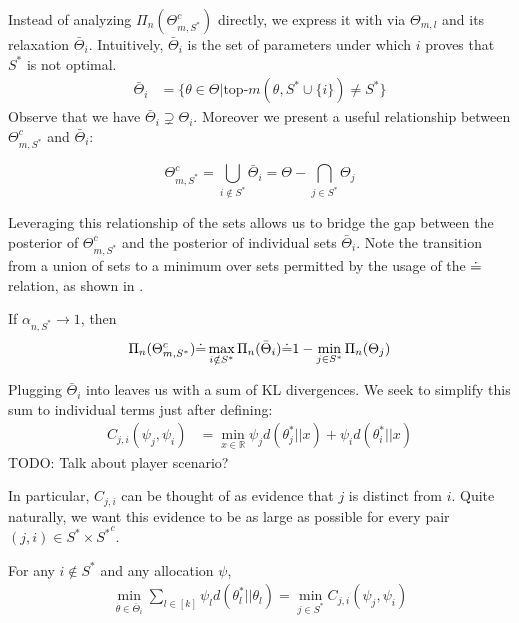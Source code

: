 Instead of analyzing $\Pi_n(\Theta_{m, S^*}^c)$ directly, we express it with via $\Theta_{m, l}$ and its relaxation $\bar{\Theta}_i$. Intuitively, $\bar{\Theta}_i$ is the set of parameters under which $i$ proves that $S^*$ is not optimal.
\begin{align}
    \bar{\Theta}_i &= \{ \theta \in \Theta | \text{top-}m(\theta, S^* \cup \{i\}) \neq S^*\}
\end{align}
Observe that we have $\bar{\Theta}_i \supsetneq \Theta_i$. Moreover we present a useful relationship between $\Theta_{m, S^*}^c$ and $\bar{\Theta}_i$:
\begin{lemma}\label{lemma:set_relation_S*_i}
  \[\Theta_{m, S^*}^c = \bigcup_{i \notin S^*} \bar{\Theta}_i = \Theta - \bigcap_{j \in S^*} \Theta_j\]
\end{lemma}
Leveraging this relationship of the sets allows us to bridge the gap between the posterior of $\Theta_{m, S^*}^c$ and the posterior of individual sets $\bar{\Theta}_i$. Note the transition from a union of sets to a minimum over sets permitted by the usage of the $\dot{=}$ relation, as shown in .
\begin{lemma}\label{lemma:posterior_S*_i} If $\alpha_{n, S^*} \rightarrow 1$, then
  \begin{align}
    \Pi_n(\Theta_{m, S^*}^c) \dot{=} \max_{i \notin S^*} \Pi_n(\bar{\Theta}_i) \dot{=} 1 - \min_{j \in S^*} \Pi_n(\Theta_j)
  \end{align}
\end{lemma}

Plugging $\bar{\Theta}_i$ into  leaves us with a sum of KL divergences. We seek to simplify this sum to individual terms just after defining:
\begin{align}
  C_{j, i}(\psi_j,\psi_i) &=  \min_{x \in \mathbb{R}} \psi_j d(\theta^*_{j} || x) + \psi_i d(\theta_{i}^* ||x) \label{eq:C}
\end{align}
TODO: Talk about player scenario?

In particular, $C_{j, i}$ can be thought of as evidence that $j$ is distinct from $i$. Quite naturally, we want this evidence to be as large as possible for every pair $(j, i) \in S^* \times {S^*}^c$.

\begin{lemma}\label{lemma:kl_to_C}
  For any $i \notin S^*$ and any allocation $\psi$,
  \begin{align}
    \min_{\theta \in \bar{\Theta}_i} \sum_{l \in [k]}\psi_l d(\theta^*_l||\theta_l) = \min_{j \in S^*} C_{j, i}(\psi_j, \psi_i)
  \end{align}
\end{lemma}

